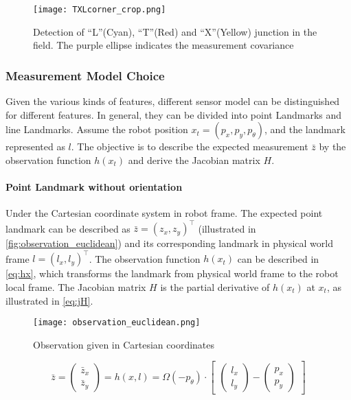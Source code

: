\begin{figure}[h!]
  \centering
  \texttt{[image: TXLcorner\_crop.png]}
  \caption{Detection of ``L''(Cyan), ``T''(Red) and ``X''(Yellow) junction in the field. The purple ellipse indicates the measurement covariance}
  \label{fig:txcorner}
\end{figure}

\subsubsection{Measurement Model Choice}\label{subsub:sensorModelChoice}
Given the various kinds of features, different sensor model can be distinguished for different features. In general, they can be divided into point Landmarks and line Landmarks. Assume the robot position $x_t = (p_x, p_y, p_{\theta})$, and the landmark represented as $l$. The objective is to describe the expected measurement $\bar{z}$ by the observation function $h(x_t)$ and derive the Jacobian matrix $H$.
\paragraph{Point Landmark without orientation}\label{par:pointLandmark}
Under the Cartesian coordinate system in robot frame. The expected point landmark can be described as $\bar{z} = (z_x, z_y)^\top$ (illustrated in \autoref{fig:observation_euclidean}) and its corresponding landmark in physical world frame $l = (l_x, l_y)^\top$. The observation function $h(x_t)$ can be described in \autoref{eq:hx}, which transforms the landmark from physical world frame to the robot local frame. The Jacobian matrix $H$ is the partial derivative of $h(x_t)$ at $x_t$, as illustrated in \autoref{eq:jH}. 

\begin{figure}[h!]
  \centering
  \texttt{[image: observation\_euclidean.png]}
  \caption{Observation given in Cartesian coordinates \cite{Tasse2013}}
  \label{fig:observation_euclidean}
\end{figure}

\begin{equation}\label{eq:hx}
  \bar{z} = \begin{pmatrix}
\bar{z}_{x}\\ 
\bar{z}_{y}
\end{pmatrix}
= 
h(x, l)
=
\Omega(-p_{\theta})
\cdot
\begin{bmatrix}
 \begin{pmatrix}
l_{x}\\ 
l_{y}
\end{pmatrix}
-
\begin{pmatrix}
p_{x}\\ 
p_{y}
\end{pmatrix}
\end{bmatrix}
\end{equation}

